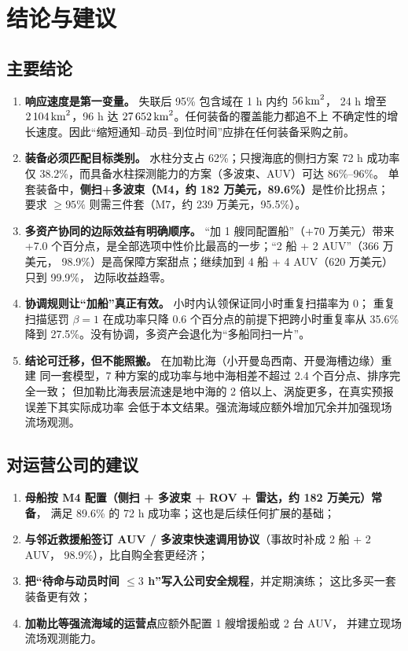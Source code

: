 \section{结论与建议}

\subsection{主要结论}

\begin{enumerate}[leftmargin=1.9em,itemsep=1pt]
\item \textbf{响应速度是第一变量。} 失联后 95\% 包含域在 1 h 内约 $56\,\mathrm{km}^2$，
      24 h 增至 $2\,104\,\mathrm{km}^2$，96 h 达 $27\,652\,\mathrm{km}^2$。任何装备的覆盖能力都追不上
      不确定性的增长速度。因此“缩短通知–动员–到位时间”应排在任何装备采购之前。
\item \textbf{装备必须匹配目标类别。} 水柱分支占 62\%；只搜海底的侧扫方案 72 h
      成功率仅 38.2\%，而具备水柱探测能力的方案（多波束、AUV）可达 86\%--96\%。
      单套装备中，\textbf{侧扫+多波束（M4，约 182 万美元，89.6\%）}是性价比拐点；
      要求 $\ge95\%$ 则需三件套（M7，约 239 万美元，95.5\%）。
\item \textbf{多资产协同的边际效益有明确顺序。} “加 1 艘同配置船”（+70 万美元）带来
      +7.0 个百分点，是全部选项中性价比最高的一步；“2 船 + 2 AUV”（366 万美元，
      98.9\%）是高保障方案甜点；继续加到 4 船 + 4 AUV（620 万美元）只到 99.9\%，
      边际收益趋零。
\item \textbf{协调规则让“加船”真正有效。} 小时内认领保证同小时重复扫描率为 0；
      重复扫描惩罚 $\beta=1$ 在成功率只降 0.6 个百分点的前提下把跨小时重复率从
      35.6\% 降到 27.5\%。没有协调，多资产会退化为“多船同扫一片”。
\item \textbf{结论可迁移，但不能照搬。} 在加勒比海（小开曼岛西南、开曼海槽边缘）重建
      同一套模型，7 种方案的成功率与地中海相差不超过 2.4 个百分点、排序完全一致；
      但加勒比海表层流速是地中海的 2 倍以上、涡旋更多，在真实预报误差下其实际成功率
      会低于本文结果。强流海域应额外增加冗余并加强现场流场观测。
\end{enumerate}

\subsection{对运营公司的建议}

\begin{enumerate}[leftmargin=1.8em,itemsep=1pt]
\item \textbf{母船按 M4 配置（侧扫 + 多波束 + ROV + 雷达，约 182 万美元）常备}，
      满足 89.6\% 的 72 h 成功率；这也是后续任何扩展的基础；
\item \textbf{与邻近救援船签订 AUV / 多波束快速调用协议}（事故时补成 2 船 + 2 AUV，
      98.9\%），比自购全套更经济；
\item \textbf{把“待命与动员时间 $\le3$ h”写入公司安全规程}，并定期演练；
      这比多买一套装备更有效；
\item \textbf{加勒比等强流海域的运营点}应额外配置 1 艘增援船或 2 台 AUV，
      并建立现场流场观测能力。
\end{enumerate}

